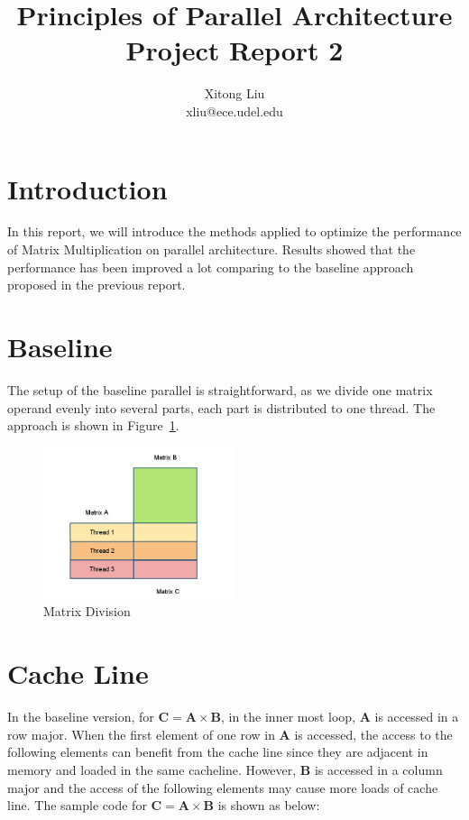 \documentclass[12pt]{article}
\title{Principles of Parallel Architecture\\
Project Report 2}
\author{Xitong Liu \\
xliu@ece.udel.edu}
\begin{document}
\maketitle

\section{Introduction}
In this report, we will introduce the methods applied to optimize
the performance of Matrix Multiplication on parallel architecture.
Results showed that the performance has been improved a lot comparing
to the baseline approach proposed in the previous report.

\section{Baseline}
The setup of the baseline parallel is straightforward, as we divide
one matrix operand evenly into several parts, each part is distributed
to one thread. The approach is shown in Figure~\ref{fig:matrix-divide}.

\begin{figure}[h!]
	\begin{center}
		\includegraphics[width=0.5\textwidth]{matrix-divide.png}
		\caption{\label{fig:matrix-divide}Matrix Division}
	\end{center}
\end{figure}

\section{Cache Line}
In the baseline version, for $\mathbf{C}=\mathbf{A}\times\mathbf{B}$,
in the inner most loop, $\mathbf{A}$ is accessed in a row major. When 
the first element of one row in $\mathbf{A}$ is accessed, the access 
to the following elements can benefit from the cache line since they
are adjacent in memory and loaded in the same cacheline. However, 
$\mathbf{B}$ is accessed in a column major and the access of the 
following elements may cause more loads of cache line. The sample code 
for $\mathbf{C}=\mathbf{A}\times\mathbf{B}$ is shown as below:
\end{document}
